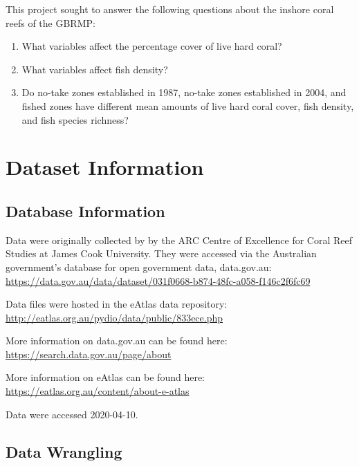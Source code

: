 \documentclass[12pt,]{article}
\providecommand{\tightlist}{%
  \setlength{\itemsep}{0pt}\setlength{\parskip}{0pt}}
\begin{document}
This project sought to answer the following questions about the inshore
coral reefs of the GBRMP:

\begin{enumerate}
\def\labelenumi{\arabic{enumi}.}
\tightlist
\item
  What variables affect the percentage cover of live hard coral?
\item
  What variables affect fish density?
\item
  Do no-take zones established in 1987, no-take zones established in
  2004, and fished zones have different mean amounts of live hard coral
  cover, fish density, and fish species richness?
\end{enumerate}

\newpage

\hypertarget{dataset-information}{%
\section{Dataset Information}\label{dataset-information}}

\hypertarget{database-information}{%
\subsection{Database Information}\label{database-information}}

Data were originally collected by by the ARC Centre of Excellence for
Coral Reef Studies at James Cook University. They were accessed via the
Australian government's database for open government data, data.gov.au:
\url{https://data.gov.au/data/dataset/031f0668-b874-48fc-a058-f146c2f6fc69}

Data files were hosted in the eAtlas data repository:
\url{http://eatlas.org.au/pydio/data/public/833ece.php}

More information on data.gov.au can be found here:
\url{https://search.data.gov.au/page/about}

More information on eAtlas can be found here:
\url{https://eatlas.org.au/content/about-e-atlas}

Data were accessed 2020-04-10.

\hypertarget{data-wrangling}{%
\subsection{Data Wrangling}\label{data-wrangling}}
\end{document}
